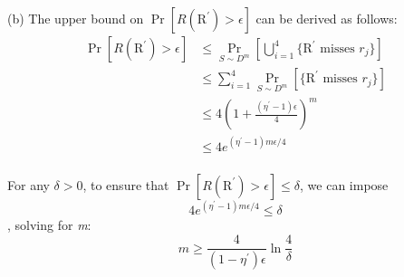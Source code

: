 \documentclass[letterpaper,11pt,notitlepage]{article}
\begin{document}
\noindent (b) The upper bound on $\Pr[R(\text{R}^\prime)>\epsilon]$ can be derived as follows:
\begin{align*}
\Pr[R(\text{R}^\prime)>\epsilon] &\le \Pr_{S\sim D^m}[\bigcup^{4}_{i=1}\{\text{R}^\prime \text{ misses }r_j\}]\\
&\le \sum^{4}_{i=1} \Pr_{S\sim D^m}[\{\text{R}^\prime \text{ misses }r_j\}]\\
&\le 4(1+\frac{(\eta^\prime-1)\epsilon}{4})^m\\
&\le 4e^{(\eta^\prime-1)m\epsilon/4}\\
\end{align*}

\indent For any $\delta >0$, to ensure that $\Pr[R(\text{R}^\prime)>\epsilon] \le \delta$, we can impose
\[4e^{(\eta^\prime-1)m\epsilon/4} \le \delta\]
\indent, solving for \textit{m}:
\[m\ge\frac{4}{(1-\eta^\prime)\epsilon}\ln\frac{4}{\delta}\]
\end{document}
